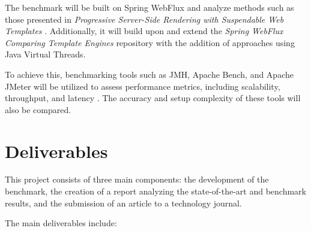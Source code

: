 \documentclass[a4paper,twoside,11pt]{article}
\begin{document}
The benchmark will be built on Spring WebFlux and analyze methods such as those presented in \textit{Progressive Server-Side Rendering with Suspendable Web Templates} \cite{pssr-susp}. Additionally, it will build upon and extend the \textit{Spring WebFlux Comparing Template Engines} repository \cite{spring-comparing-template-engines} with the addition of approaches using Java Virtual Threads.

To achieve this, benchmarking tools such as JMH, Apache Bench, and Apache JMeter will be utilized to assess performance metrics, including scalability, throughput, and latency \cite{benchmarking_web, jmh_benchmark}. The accuracy and setup complexity of these tools will also be compared.

\section{Deliverables}

This project consists of three main components: the development of the benchmark, the creation of a report analyzing the state-of-the-art and benchmark results, and the submission of an article to a technology journal.

The main deliverables include:
\end{document}
